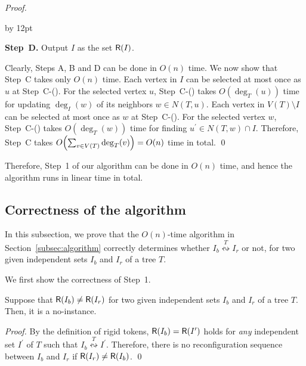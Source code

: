 \documentclass{llncs}
\newcommand{\Nei}[2]{N(#1,#2)}
\newcommand{\bfI}{I}
\newcommand{\sevstep}{\leftrightsquigarrow}
\newcommand{\sevstepT}[1]{\overset{#1}{\sevstep}}
\newcommand{\ImSet}[1]{{\sf R}(\bfI_{#1})}
\newcommand{\ImSetp}{{\sf R}(\bfI^\prime)}
\newenvironment{listing}[1]{\begin{list}{*}{\settowidth{\labelwidth}{#1}\setlength{\leftmargin}{\labelwidth}\advance \leftmargin by 12pt
\setlength{\itemsep}{0pt}\setlength{\parsep}{0pt}\setlength{\topsep}{0pt}\setlength{\parskip}{0pt}}}{\end{list}}
\newcounter{one}
\newcommand{\one}{{\rm \roman{one}}}
\newcounter{two}
\newcommand{\two}{{\rm \roman{two}}}
\newcounter{three}
\newcommand{\three}{{\rm \roman{three}}}
\begin{document}
\begin{proof}
\begin{listing}{{\bf Step~B.}}
  \item[{\bf Step~D.}] Output $\bfI$ as the set $\ImSet{}$.
\end{listing}
\smallskip

	Clearly, Steps A, B and D can be done in $O(n)$ time.
	We now show that Step~C takes only $O(n)$ time.
	Each vertex in $\bfI$ can be selected at most once as $u$ at Step~C-(\one).
	For the selected vertex $u$, Step~C-(\two) takes $O(\deg_{T}(u))$ time for updating $\deg_{I}(w)$ of its neighbors $w \in \Nei{T}{u}$.
	Each vertex in $V(T) \setminus \bfI$ can be selected at most once as $w$ at Step~C-(\three).
	For the selected vertex $w$, Step~C-(\three) takes $O(\deg_{T}(w))$ time for finding $u^\prime \in \Nei{T}{w} \cap \bfI$.
	Therefore, Step~C takes $O \Bigl(\sum_{v \in V(T)} \deg_{T}(v) \Bigr) = O(n)$ time in total.
\qed
\end{proof}

	Therefore, Step~1 of our algorithm can be done in $O(n)$ time, and hence the algorithm runs in linear time in total.



	\subsection{Correctness of the algorithm}
	\label{subsec:correctness}

	In this subsection, we prove that the $O(n)$-time algorithm in Section~\ref{subsec:algorithm} correctly determines whether $\bfI_b \sevstepT{T} \bfI_r$ or not, for two given independent sets $\bfI_b$ and $\bfI_r$ of a tree $T$.
\smallskip
	
	We first show the correctness of Step~1.
	\begin{lemma} \label{lem:step1}
	Suppose that $\ImSet{b} \neq \ImSet{r}$ for two given independent sets $\bfI_b$ and $\bfI_r$ of a tree $T$. 
	Then, it is a no-instance.
	\end{lemma}
	\begin{proof}
	By the definition of rigid tokens, $\ImSet{b} = \ImSetp$ holds for \emph{any} independent set $\bfI^\prime$ of $T$ such that $\bfI_b \sevstepT{T} \bfI^\prime$. 
	Therefore, there is no reconfiguration sequence between $\bfI_b$ and $\bfI_r$ if $\ImSet{r} \neq \ImSet{b}$.
	\qed
	\end{proof}
\end{document}
